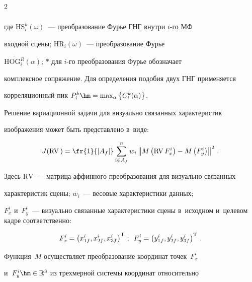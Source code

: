 \begin{multicols}{2}
\begin{multline*}

\end{multline*}

где $\mathrm{HS}_i^k(\omega)$~--- преобразование Фурье ГНГ внутри $i$-го МФ 

входной сцены; $\mathrm{HR}_i(\omega)$~--- преобразование Фурье 

$\overline{\mathrm{HOG}_i^R}(\alpha)$; $*$ для $i$-го преобразования Фурье обозначает 

комплексное сопряжение. Для определения подобия двух ГНГ применяется 

корреляционный пик $P_i^k\hm= \max\nolimits_\alpha \left\{ 

C_i^k(\alpha)\right\}$.

  

  Решение вариационной задачи для визуально связанных характеристик 

изоб\-ра\-же\-ния может быть пред\-став\-ле\-но в~виде:

  \begin{equation*}

  J(\mathrm{RV}\,)=\fr{1}{\left\vert {A}_f \right\vert} 

  \sum\limits^n_{i\in A_f} {w}_i\left\| 

M\left(\mathrm{RV}\,F_x^i\right) - M\left(F_y^i\right)\right\|^2\,.


  \end{equation*}

Здесь $\mathrm{RV}$~--- матрица аффинного преобразования для визуально связанных 

характеристик сцены; ${w}_i$~--- весовые характеристики данных; 

$F_x^i$ и~$F_y^i$~--- визуально связанные характеристики сцены в~исходном и~целевом кадре соответственно:

\begin{equation*}

F_x^i=\left( x^i_{1f}, x^i_{2f}, x^i_{3f}\right)^{\mathrm{T}}\,;\enskip

F_y^i= \left( y^i_{1f}, y^i_{2f}, y^i_{3f}\right)^{\mathrm{T}}\,.


\end{equation*}

  

  Функция~$M$ осуществляет преобразование координат точек~$F_x^i$ 

и~$F_y^i\hm\in \mathbb{R}^3$ из трехмерной сис\-те\-мы координат относительно 


\end{multicols}
